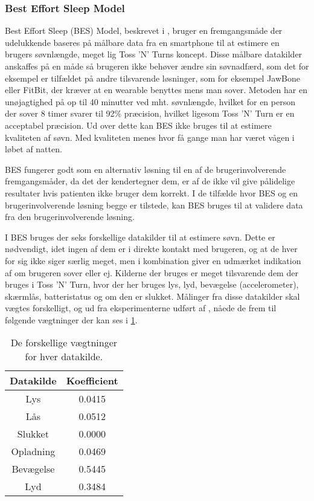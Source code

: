 \subsubsection{Best Effort Sleep Model}\label{sec:BES}
Best Effort Sleep (BES) Model, beskrevet i \citet{6563918}, bruger en fremgangsmåde der udelukkende baseres på målbare data fra en smartphone til at estimere en brugers søvnlængde, meget lig Toss 'N' Turns koncept.
Disse målbare datakilder anskaffes på en måde så brugeren ikke behøver ændre sin søvnadfærd, som det for eksempel er tilfældet på andre tilsvarende løsninger, som for eksempel JawBone eller FitBit, der kræver at en wearable benyttes mens man sover.
Metoden har en unøjagtighed på op til 40 minutter ved mht. søvnlængde, hvilket for en person der sover 8 timer svarer til 92\% præcision, hvilket ligesom Toss 'N' Turn er en acceptabel præcision.
Ud over dette kan BES ikke bruges til at estimere kvaliteten af søvn.
Med kvaliteten menes hvor få gange man har været vågen i løbet af natten.

BES fungerer godt som en alternativ løsning til en af de brugerinvolverende fremgangsmåder, da det der kendertegner dem, er af de ikke vil give pålidelige resultater hvis patienten ikke bruger dem korrekt.
I de tilfælde hvor BES og en brugerinvolverende løsning begge er tilstede, kan BES bruges til at validere data fra den brugerinvolverende løsning. 

I BES bruges der seks forskellige datakilder til at estimere søvn.
Dette er nødvendigt, idet ingen af dem er i direkte kontakt med brugeren, og at de hver for sig ikke siger særlig meget, men i kombination giver en udmærket indikation af om brugeren sover eller ej.
Kilderne der bruges er meget tilsvarende dem der bruges i Toss 'N' Turn, hvor der her bruges lys, lyd, bevægelse (accelerometer), skærmlås, batteristatus og om den er slukket.
Målinger fra disse datakilder skal vægtes forskelligt, og ud fra eksperimenterne udført af \citet{6563918}, nåede de frem til følgende vægtninger der kan ses i \cref{tab:vaegtninger}.

\begin{table}[h]
\centering
\begin{tabular}{|c|c|}
\hline Datakilde    & Koefficient\\
\hline Lys          & 0.0415 \\ 
\hline Lås          & 0.0512 \\ 
\hline Slukket      & 0.0000 \\ 
\hline Opladning    & 0.0469 \\ 
\hline Bevægelse    & 0.5445 \\ 
\hline Lyd          & 0.3484 \\ 
\hline 
\end{tabular}
\caption{De forskellige vægtninger for hver datakilde.}
\label{tab:vaegtninger}
\end{table}

